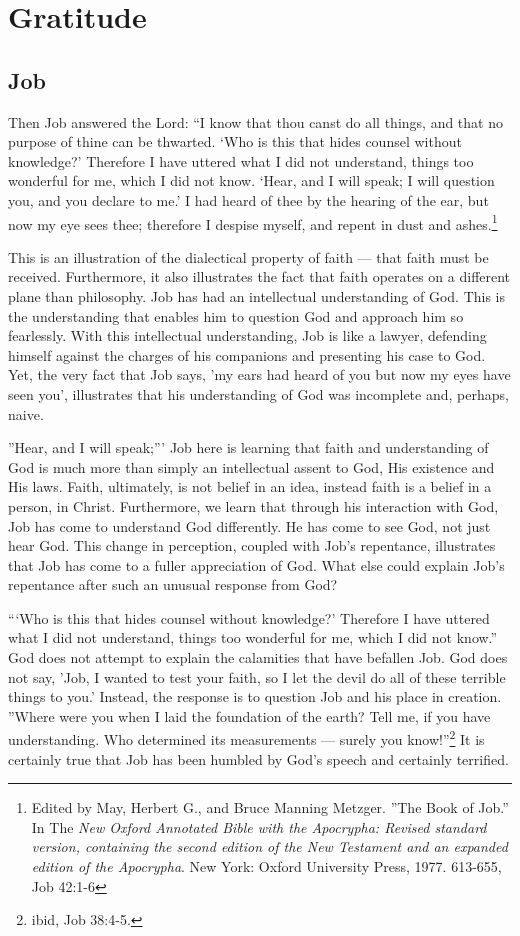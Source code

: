 \chapter{Gratitude}
	\section{Job}
	
Then Job answered the Lord: ``I know that thou canst do all things, and that no purpose of thine can be thwarted. `Who is this that hides counsel without knowledge?' Therefore I have uttered what I did not understand, things too wonderful for me, which I did not know. `Hear, and I will speak; I will question you, and you declare to me.' I had heard of thee by the hearing of the ear, but now my eye sees thee; therefore I despise myself, and repent in dust and ashes.\footnote{Edited by May, Herbert G., and Bruce Manning Metzger. ''The Book of Job.'' In The \emph{New Oxford Annotated Bible with the Apocrypha: Revised standard version, containing the second edition of the New Testament and an expanded edition of the Apocrypha}. New York: Oxford University Press, 1977. 613-655, Job 42:1-6} 


This is an illustration of the dialectical property of faith --- that faith must be received. Furthermore, it also illustrates the fact that faith operates on a different plane than philosophy. Job has had an intellectual understanding of God. This is the understanding that enables him to question God and approach him so fearlessly. With this intellectual understanding, Job is like a lawyer, defending himself against the charges of his companions and presenting his case to God. Yet, the very fact that Job says, 'my ears had heard of you but now my eyes have seen you', illustrates that his understanding of God was incomplete and, perhaps, naive.

''Hear, and I will speak;''' Job here is learning that faith and understanding of God is much more than simply an intellectual assent to God, His existence and His laws. Faith, ultimately, is not belief in an idea, instead faith is a belief in a person, in Christ. Furthermore, we learn that through his interaction with God, Job has come to understand God differently. He has come to see God, not just hear God. This change in perception, coupled with Job's repentance, illustrates that Job has come to a fuller appreciation of God. What else could explain Job's repentance after such an unusual response from God? 

```Who is this that hides counsel without knowledge?' Therefore I have uttered what I did not understand, things too wonderful for me, which I did not know.'' God does not attempt to explain the calamities that have befallen Job. God does not say, 'Job, I wanted to test your faith, so I let the devil do all of these terrible things to you.' Instead, the response is to question Job and his place in creation. ''Where were you when I laid the foundation of the earth? Tell me, if you have understanding. Who determined its measurements --- surely you know!''\footnote{ibid, Job 38:4-5.} It is certainly true that Job has been humbled by God's speech and certainly terrified. 

